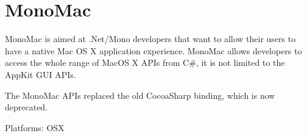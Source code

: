 \chapter{MonoMac}
\label{chap:MonoMac}

MonoMac is aimed at .Net/Mono developers that want to allow their users to have
a native Mac OS X application experience. MonoMac allows developers to access
the whole range of MacOS X APIs from C\#, it is not limited to the AppKit GUI APIs.  

The MonoMac APIs replaced the old CocoaSharp binding, which is now deprecated.

Platforms: OSX